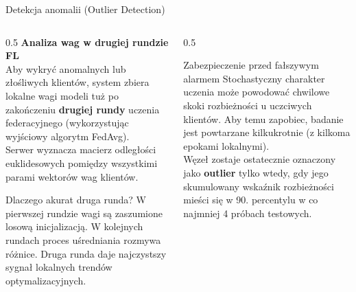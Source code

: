 \documentclass[9pt,aspectratio=169]{beamer}
\begin{document}
\begin{frame}{Detekcja anomalii (Outlier Detection)}
\begin{columns}[T]
\begin{column}{0.5\textwidth}
\textbf{Analiza wag w drugiej rundzie FL}\\[4pt]
Aby wykryć anomalnych lub złośliwych klientów, system zbiera lokalne wagi modeli tuż po zakończeniu \textbf{drugiej rundy} uczenia federacyjnego (wykorzystując wyjściowy algorytm FedAvg).\\[6pt]
Serwer wyznacza macierz odległości euklidesowych pomiędzy wszystkimi parami wektorów wag klientów.
\begin{infoboxorange}{Dlaczego akurat druga runda?}
\footnotesize W pierwszej rundzie wagi są zaszumione losową inicjalizacją. W kolejnych rundach proces uśredniania rozmywa różnice. Druga runda daje najczystszy sygnał lokalnych trendów optymalizacyjnych.
\end{infoboxorange}
\end{column}
\begin{column}{0.5\textwidth}
\begin{infobox}{Zabezpieczenie przed fałszywym alarmem}
Stochastyczny charakter uczenia może powodować chwilowe skoki rozbieżności u uczciwych klientów. Aby temu zapobiec, badanie jest powtarzane kilkukrotnie (z kilkoma epokami lokalnymi).\\[6pt]
Węzeł zostaje ostatecznie oznaczony jako \textbf{outlier} tylko wtedy, gdy jego skumulowany wskaźnik rozbieżności mieści się w 90. percentylu w co najmniej 4 próbach testowych.
\end{infobox}
\end{column}
\end{columns}
\end{frame}
\end{document}
